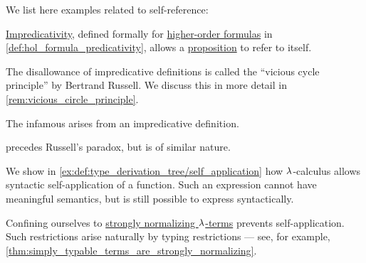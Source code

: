 \begin{example}\label{ex:self_reference}
  We list here examples related to self-reference:
  \begin{thmenum}
     \hyperref[con:impredicative_definition]{Impredicativity}, defined formally for \hyperref[def:hol_term/formula]{higher-order formulas} in \cref{def:hol_formula_predicativity}, allows a \hyperref[con:proposition]{proposition} to refer to itself.

    The disallowance of impredicative definitions is called the \enquote{vicious cycle principle} by Bertrand Russell. We discuss this in more detail in \cref{rem:vicious_circle_principle}.

     The infamous  arises from an impredicative definition.

     precedes Russell's paradox, but is of similar nature.

     We show in \cref{ex:def:type_derivation_tree/self_application} how \( {\mathrm \lambda} \)-calculus allows syntactic self-application of a function. Such an expression cannot have meaningful semantics, but is still possible to express syntactically.

    Confining ourselves to \hyperref[def:strongly_normalizing_lambda_term]{strongly normalizing \( {\mathrm \lambda} \)-terms} prevents self-application. Such restrictions arise naturally by typing restrictions --- see, for example, \cref{thm:simply_typable_terms_are_strongly_normalizing}.
  \end{thmenum}
\end{example}

